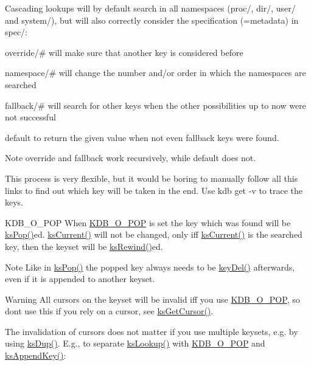 Cascading lookups will by default search in all namespaces (proc/, dir/, user/ and system/), but will also correctly consider the specification (=metadata) in spec/\+:


\begin{DoxyItemize}
\item {\ttfamily override/\#} will make sure that another key is considered before
\item {\ttfamily namespace/\#} will change the number and/or order in which the namespaces are searched
\item {\ttfamily fallback/\#} will search for other keys when the other possibilities up to now were not successful
\item {\ttfamily default} to return the given value when not even {\ttfamily fallback} keys were found.
\end{DoxyItemize}

\begin{DoxyNote}{Note}
override and fallback work recursively, while default does not.
\end{DoxyNote}
This process is very flexible, but it would be boring to manually follow all this links to find out which key will be taken in the end. Use {\ttfamily kdb get -\/v} to trace the keys.

\begin{DoxyParagraph}{K\+D\+B\+\_\+\+O\+\_\+\+P\+OP}
When \hyperlink{group__keyset_gga98a3d6a4016c9dad9cbd1a99a9c2a45aa52fb5f2cc86773d393da62bebebf7984}{K\+D\+B\+\_\+\+O\+\_\+\+P\+OP} is set the key which was found will be \hyperlink{group__keyset_gae42530b04defb772059de0600159cf69}{ks\+Pop()}ed. \hyperlink{group__keyset_ga4287b9416912c5f2ab9c195cb74fb094}{ks\+Current()} will not be changed, only iff \hyperlink{group__keyset_ga4287b9416912c5f2ab9c195cb74fb094}{ks\+Current()} is the searched key, then the keyset will be \hyperlink{group__keyset_gabe793ff51f1728e3429c84a8a9086b70}{ks\+Rewind()}ed.
\end{DoxyParagraph}
\begin{DoxyNote}{Note}
Like in \hyperlink{group__keyset_gae42530b04defb772059de0600159cf69}{ks\+Pop()} the popped key always needs to be \hyperlink{group__key_ga3df95bbc2494e3e6703ece5639be5bb1}{key\+Del()} afterwards, even if it is appended to another keyset.
\end{DoxyNote}
\begin{DoxyWarning}{Warning}
All cursors on the keyset will be invalid iff you use \hyperlink{group__keyset_gga98a3d6a4016c9dad9cbd1a99a9c2a45aa52fb5f2cc86773d393da62bebebf7984}{K\+D\+B\+\_\+\+O\+\_\+\+P\+OP}, so don\textquotesingle{}t use this if you rely on a cursor, see \hyperlink{group__keyset_gaffe507ab9281c322eb16c3e992075d29}{ks\+Get\+Cursor()}.
\end{DoxyWarning}
The invalidation of cursors does not matter if you use multiple keysets, e.\+g. by using \hyperlink{group__keyset_gac59e4b328245463f1451f68d5106151c}{ks\+Dup()}. E.\+g., to separate \hyperlink{group__keyset_gaa34fc43a081e6b01e4120daa6c112004}{ks\+Lookup()} with \hyperlink{group__keyset_gga98a3d6a4016c9dad9cbd1a99a9c2a45aa52fb5f2cc86773d393da62bebebf7984}{K\+D\+B\+\_\+\+O\+\_\+\+P\+OP} and \hyperlink{group__keyset_gaa5a1d467a4d71041edce68ea7748ce45}{ks\+Append\+Key()}\+:


